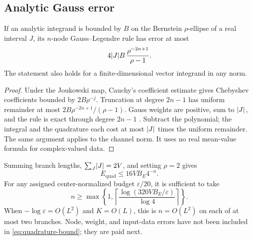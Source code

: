 \subsection{Analytic Gauss error}
\begin{lemma}\label{lem:gauss}
If an analytic integrand is bounded by \(B\) on the
Bernstein \(\rho\)-ellipse of a real interval \(J\), its
\(n\)-node Gauss--Legendre rule has error at most
\[
 4\lvert J\rvert B\,\frac{\rho^{-2n+1}}{\rho-1}.
\]
The statement also holds for a finite-dimensional vector integrand
in any norm.
\end{lemma}
\begin{proof}
Under the Joukowski map, Cauchy's coefficient estimate gives
Chebyshev coefficients bounded by \(2B\rho^{-j}\).
Truncation at degree \(2n-1\) has uniform remainder at most
\(2B\rho^{-2n+1}/(\rho-1)\).
Gauss weights are positive, sum to \(\lvert J\rvert\), and the rule
is exact through degree \(2n-1\) \cite{dlmfgauss}.
Subtract the polynomial; the integral and the quadrature
each cost at most \(\lvert J\rvert\) times the uniform remainder.
The same argument applies to the channel norm. It uses no
real mean-value formula for complex-valued data.
\end{proof}
Summing branch lengths, \(\sum_J\lvert J\rvert=2V\), and setting
\(\rho=2\) gives
\begin{equation}
 E_{\mathrm{quad}}\le16VB_E4^{-n}.
 \label{eq:quadrature-bound}
\end{equation}
For any assigned center-normalized budget \(\varepsilon/20\),
it is sufficient to take
\begin{equation}
 n\ge\max\left\{1,\left\lceil
           \frac{\log(320VB_E/\varepsilon)}{\log4}\right\rceil\right\}.
 \label{eq:quadrature-order}
\end{equation}
When \(-\log\varepsilon=O(L^2)\) and \(K=O(L)\), this is
\(n=O(L^2)\) on each of at most two branches.
Node, weight, and input-data errors have not been included
in \eqref{eq:quadrature-bound}; they are paid next.
